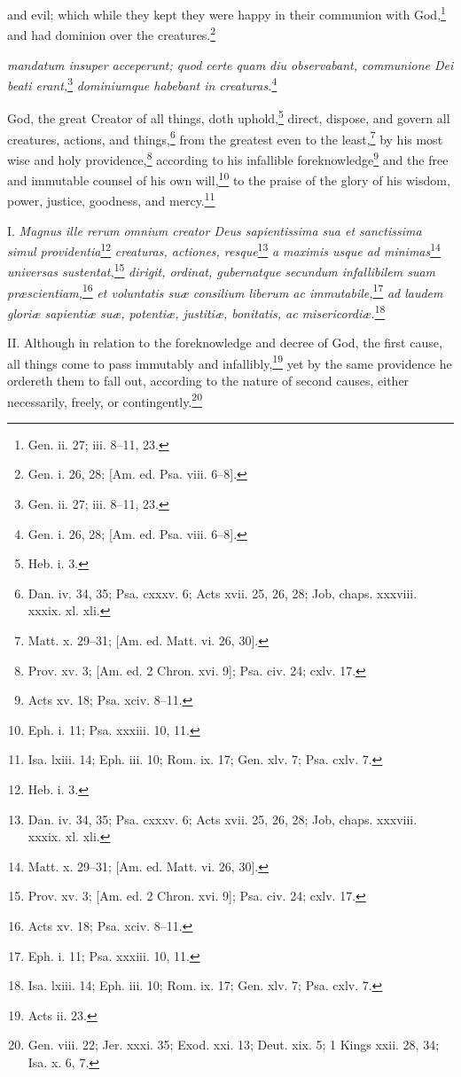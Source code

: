 and evil; which while they kept they were happy in their communion with God,\footnote{Gen. ii. 27; iii. 8–11, 23.} and had dominion over the creatures.\footnote{Gen. i. 26, 28; [Am. ed. Psa. viii. 6–8].}

\emph{mandatum insuper acceperunt; quod certe quam diu observabant, communione Dei beati erant,}\footnote{Gen. ii. 27; iii. 8–11, 23.}\emph{ dominiumque habebant in creaturas.}\footnote{Gen. i. 26, 28; [Am. ed. Psa. viii. 6–8].}


God, the great Creator of all things, doth uphold,\footnote{Heb. i. 3.} direct, dispose, and govern all creatures, actions, and things,\footnote{Dan. iv. 34, 35; Psa. cxxxv. 6; Acts xvii. 25, 26, 28; Job, chaps. xxxviii. xxxix. xl. xli.} from the greatest even to the least,\footnote{Matt. x. 29–31; [Am. ed. Matt. vi. 26, 30].} by his most wise and holy providence,\footnote{Prov. xv. 3; [Am. ed. 2 Chron. xvi. 9]; Psa. civ. 24; cxlv. 17.} according to his infallible foreknowledge\footnote{Acts xv. 18; Psa. xciv. 8–11.} and the free and immutable counsel of his own will,\footnote{Eph. i. 11; Psa. xxxiii. 10, 11.} to the praise of the glory of his wisdom, power, justice, goodness, and mercy.\footnote{Isa. lxiii. 14; Eph. iii. 10; Rom. ix. 17; Gen. xlv. 7; Psa. cxlv. 7.}

I. \emph{Magnus ille rerum omnium creator Deus sapientissima sua et sanctissima simul providentia}\footnote{Heb. i. 3.}\emph{ creaturas, actiones, resque}\footnote{Dan. iv. 34, 35; Psa. cxxxv. 6; Acts xvii. 25, 26, 28; Job, chaps. xxxviii. xxxix. xl. xli.}\emph{ a maximis usque ad minimas}\footnote{Matt. x. 29–31; [Am. ed. Matt. vi. 26, 30].} \emph{universas sustentat,}\footnote{Prov. xv. 3; [Am. ed. 2 Chron. xvi. 9]; Psa. civ. 24; cxlv. 17.}\emph{ dirigit, ordinat, gubernatque secundum infallibilem suam præscientiam,}\footnote{Acts xv. 18; Psa. xciv. 8–11.}\emph{ et voluntatis suæ consilium liberum ac immutabile,}\footnote{Eph. i. 11; Psa. xxxiii. 10, 11.}\emph{ ad laudem gloriæ sapientiæ suæ, potentiæ, justitiæ, bonitatis, ac misericordiæ.}\footnote{Isa. lxiii. 14; Eph. iii. 10; Rom. ix. 17; Gen. xlv. 7; Psa. cxlv. 7.}

II. Although in relation to the foreknowledge and decree of God, the first cause, all things come to pass immutably and infallibly,\footnote{Acts ii. 23.} yet by the same providence he ordereth them to fall out, according to the nature of second causes, either necessarily, freely, or contingently.\footnote{Gen. viii. 22; Jer. xxxi. 35; Exod. xxi. 13; Deut. xix. 5; 1 Kings xxii. 28, 34; Isa. x. 6, 7.}

